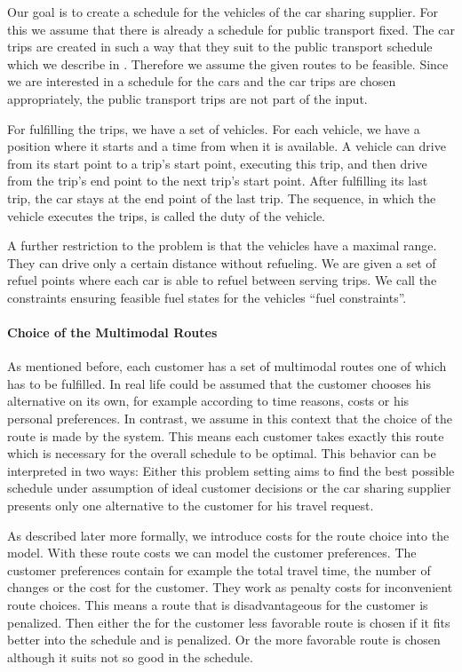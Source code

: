 Our goal is to create a schedule for the vehicles of the car sharing supplier. For this we assume that there is already a schedule for public transport fixed. The car trips are created in such a way that they suit to the public transport schedule which we describe in . Therefore we assume the given routes to be feasible. Since we are interested in a schedule for the cars and the car trips are chosen appropriately, the public transport trips are not part of the input. 

For fulfilling the trips, we have a set of vehicles. For each vehicle, we have a position where it starts and a time from when it is available. A vehicle can drive from its start point to a trip's start point, executing this trip, and then drive from the trip's end point to the next trip's start point. After fulfilling its last trip, the car stays at the end point of the last trip. The sequence, in which the vehicle executes the trips, is called the duty of the vehicle. 

A further restriction to the problem is that the vehicles have a maximal range. They can drive only a certain distance without refueling. We are given a set of refuel points where each car is able to refuel between serving trips. We call the constraints ensuring feasible fuel states for the vehicles \enquote{fuel constraints}.

\paragraph{Choice of the Multimodal Routes} \parfill

As mentioned before, each customer has a set of multimodal routes one of which has to be fulfilled. In real life could be assumed that the customer chooses his alternative on its own, for example according to time reasons, costs or his personal preferences. In contrast, we assume in this context that the choice of the route is made by the system. This means each customer takes exactly this route which is necessary for the overall schedule to be optimal. This behavior can be interpreted in two ways: Either this problem setting aims to find the best possible schedule under assumption of ideal customer decisions or the car sharing supplier presents only one alternative to the customer for his travel request.

As described later more formally, we introduce costs for the route choice into the model. With these route costs we can model the customer preferences. The customer preferences contain for example the total travel time, the number of changes or the cost for the customer. They work as penalty costs for inconvenient route choices. This means a route that is disadvantageous for the customer is penalized. Then either the for the customer less favorable route is chosen if it fits better into the schedule and is penalized. Or the more favorable route is chosen although it suits not so good in the schedule.

